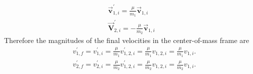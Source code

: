  $$\begin{gathered}
 \overrightarrow{\mathbf{v}}_{1, i}^{\prime}=\frac{\mu}{m_{1}} \overrightarrow{\mathbf{v}}_{1, i} \\
 \overrightarrow{\mathbf{V}}_{2, i}^{\prime}=-\frac{\mu}{m_{2}} \overrightarrow{\mathbf{v}}_{1, i}
 \end{gathered}$$
 Therefore the magnitudes of the final velocities in the center-of-mass frame are
 $$
 \begin{aligned}
 &v_{1, f}^{\prime}=v_{1, i}^{\prime}=\frac{\mu}{m_{1}} v_{1,2, i}^{\prime}=\frac{\mu}{m_{1}} v_{1,2, i}=\frac{\mu}{m_{1}} v_{1, i} . \\
 &v_{2, f}^{\prime}=v_{2, i}^{\prime}=\frac{\mu}{m_{2}} v_{1,2, i}^{\prime}=\frac{\mu}{m_{2}} v_{1,2, i}=\frac{\mu}{m_{2}} v_{1, i} .
 \end{aligned}
 $$
